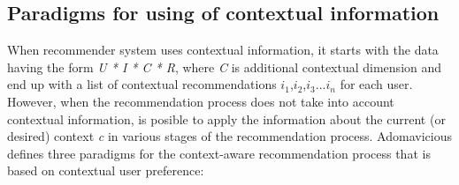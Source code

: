 \subsection{Paradigms for using of contextual information}

When recommender system uses contextual information, it starts
with the data having the form \textit{U * I * C * R}, where \textit{C}
is additional contextual dimension and end up with a list of
contextual recommendations $i_{1}$,$i_{2}$,$i_{3}$...$i_{n}$ for each
user. However, when the recommendation process does not take into
account  contextual information, is posible to apply the
information about the current (or desired) context \textit{c} in
various stages of the recommendation process.
Adomavicious\cite{adomavicius2011context} defines three paradigms for
the context-aware recommendation process that is based on contextual
user preference:
